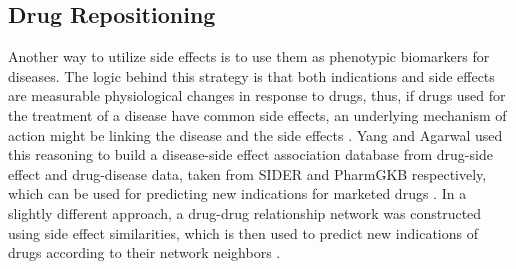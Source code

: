 \subsection{Drug Repositioning}
Another way to utilize side effects is to use them as phenotypic biomarkers for diseases. The logic behind this strategy is that both indications and side effects are measurable physiological changes in response to drugs, thus, if drugs used for the treatment of a disease have common side effects, an underlying mechanism of action might be linking the disease and the side effects \cite{yang_systematic_2011}. Yang and Agarwal used this reasoning to build a disease-side effect association database from drug-side effect and drug-disease data, taken from \ac{SIDER} and PharmGKB respectively, which can be used for predicting new indications for marketed drugs \cite{yang_systematic_2011}. In a slightly different approach, a drug-drug relationship network was constructed using side effect similarities, which is then used to predict new indications of drugs according to their network neighbors \cite{ye_construction_2014}.
